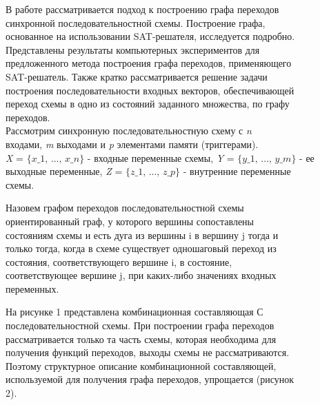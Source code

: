 \documentclass[12pt]{article}
\begin{document}
\newline
\hspace{0.5cm}
В работе рассматривается подход к построению графа переходов\\
синхронной последовательностной схемы. Построение графа,\\
основанное на использовании SAT-решателя, исследуется подробно.\\
Представлены результаты компьютерных экспериментов для\\
предложенного метода построения графа переходов, применяющего\\
SAT-решатель. Также кратко рассматривается решение задачи\\
построения последовательности входных векторов, обеспечивающей\\
переход схемы в одно из состояний заданного множества, по графу\\
переходов.\\

\newpage
\hspace{0.5cm}
Рассмотрим синхронную последовательностную схему с \textit{n}\\
входами, \textit{m} выходами и \textit{p} элементами памяти (триггерами).\\
\textit{X} = $\{\textit{{x_1, ..., x_n}}\}$ - \textnormal{входные переменные схемы}, \textit{Y} = $\{\textit{{y_1, ..., y_m}}\}$ - \textnormal{ее}\\
\textnormal{выходные переменные}, \textit{Z} = $\{\textit{{z_1, ..., z_p}}\}$ - \textnormal{внутренние переменные\\
схемы.}

\hspace{0.5cm}
\textnormal{Назовем} графом переходов последовательностной схемы\\
\textnormal{ориентированный граф, у которого вершины сопоставлены\\
состояниям схемы и есть дуга из вершины} i \textnormal{в вершину} j \textnormal{тогда и\\
только тогда, когда в схеме существует одношаговый переход из\\
состояния, соответствующего вершине} i, \textnormal{в состояние,\\
соответствующее вершине} j, \textnormal{при каких-либо значениях входных\\
переменных}.

\hspace{0.5cm}
\textnormal{На рисунке 1 представлена комбинационная составляющая} С\\
\textnormal{последовательностной схемы. При построении графа переходов\\
рассматривается только та часть схемы, которая необходима для\\
получения функций переходов, выходы схемы не рассматриваются.\\
Поэтому структурное описание комбинационной составляющей,\\
используемой для получения графа переходов, упрощается (рисунок\\
2).}\\
\end{document}
